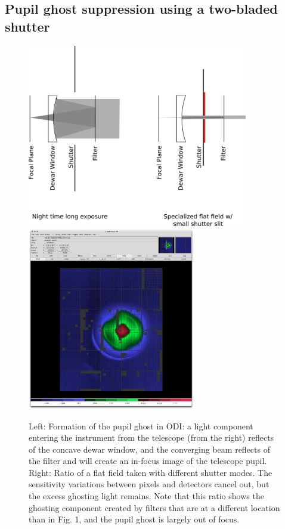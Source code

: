 \documentclass[]{spieman}
\begin{document}
\subsection{Pupil ghost suppression using a two-bladed shutter}

\begin{figure}[h]
    \includegraphics[height=8cm]{images/odishutterpupilghostsupression.png}
    \hspace{0.5cm} \includegraphics[height=8cm]{images/odi_layeronepg.png}
    \caption{ Left: Formation of the pupil ghost in ODI: a light component
        entering the instrument from the telescope (from the right) reflects of the
        concave dewar window, and the converging beam reflects of the filter and
        will create an in-focus image of the telescope pupil. Right: Ratio of a flat
        field taken with different shutter modes. The sensitivity variations between
        pixels and detectors cancel out, but the excess ghosting light remains. Note
        that this ratio shows the ghosting component created by filters that are at
        a different location than in Fig. 1, and the pupil ghost is largely out of
        focus.} \end{figure}
\end{document}
